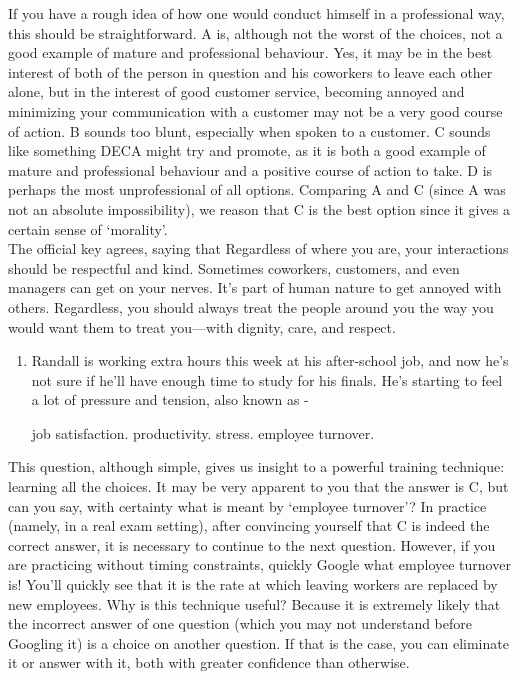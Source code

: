 \documentclass[12pt]{article}
\newcounter{choice}
\renewcommand\thechoice{\Alph{choice}}
\newcommand\choicelabel{\thechoice.}
\newenvironment{choices}%
  {\list{\choicelabel}%
     {\usecounter{choice}\def\makelabel##1{\hss\llap{##1}}%
       \settowidth{\leftmargin}{W.\hskip\labelsep\hskip 2.5em}%
       \def\choice{%
         \item
       } %
       \labelwidth\leftmargin\advance\labelwidth-\labelsep
       \topsep=0pt
       \partopsep=0pt
     }%
  }%
  {\endlist}
\begin{document}
	If you have a rough idea of how one would conduct himself in a professional way, this should be straightforward. A is, although not the worst of the choices, not a good example of mature and professional behaviour. Yes, it may be in the best interest of both of the person in question and his coworkers to leave each other alone, but in the interest of good customer service, becoming annoyed and minimizing your communication with a customer may not be a very good course of action. B sounds too blunt, especially when spoken to a customer. C sounds like something DECA might try and promote, as it is both a good example of mature and professional behaviour and a positive course of action to take. D is perhaps the most unprofessional of all options. Comparing A and C (since A was not an absolute impossibility), we reason that C is the best option since it gives a certain sense of \lq morality'. \\
	
	The official key agrees, saying that \ldq Regardless of where you are, your interactions should be respectful and kind. Sometimes coworkers, customers, and even managers can get on your nerves. It's part of human nature to get annoyed with others. Regardless, you should always treat the people around you the way you would want them to treat you—with dignity, care, and respect.\rdq
	
\begin{enumerate}[resume]
	\item Randall is working extra hours this week at his after-school job, and now he's not sure if he'll have enough time to study for his finals. He's starting to feel a lot of pressure and tension, also known as
	\begin{choices}
		\choice job satisfaction.
		\choice productivity.
		\choice stress.
		\choice employee turnover.
	\end{choices}
\end{enumerate}

This question, although simple, gives us insight to a powerful training technique: learning all the choices. It may be very apparent to you that the answer is C, but can you say, with certainty what is meant by \lq employee turnover'? In practice (namely, in a real exam setting), after convincing yourself that C is indeed the correct answer, it is necessary to continue to the next question. However, if you are practicing without timing constraints, quickly Google what employee turnover is! You'll quickly see that it is the rate at which leaving workers are replaced by new employees. Why is this technique useful? Because it is extremely likely that the incorrect answer of one question (which you may not understand before Googling it) is a choice on another question. If that is the case, you can eliminate it or answer with it, both with greater confidence than otherwise.
\end{document}
